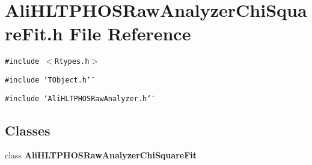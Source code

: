 \section{Ali\-HLTPHOSRaw\-Analyzer\-Chi\-Square\-Fit.h File Reference}
\label{AliHLTPHOSRawAnalyzerChiSquareFit_8h}


{\tt \#include $<$Rtypes.h$>$}\par
{\tt \#include \char`\"{}TObject.h\char`\"{}}\par
{\tt \#include \char`\"{}Ali\-HLTPHOSRaw\-Analyzer.h\char`\"{}}\par
\subsection*{Classes}
\begin{CompactItemize}
\item 
class {\bf Ali\-HLTPHOSRaw\-Analyzer\-Chi\-Square\-Fit}
\end{CompactItemize}
